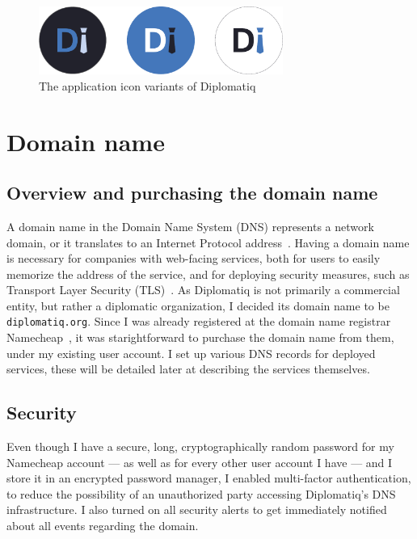 \begin{figure}[!htb]
    \centering
    \includegraphics[width=8cm]{figures/diplomatiq-app-icons.pdf}
    \caption{The application icon variants of Diplomatiq}
    \label{fig:diplomatiq-app-icons}
\end{figure}

\section{Domain name}

\subsection{Overview and purchasing the domain name}

A domain name in the Domain Name System (DNS) represents a network domain, or it translates to an Internet Protocol address~\cite{rfc1035}. Having a domain name is necessary for companies with web-facing services, both for users to easily memorize the address of the service, and for deploying security measures, such as Transport Layer Security (TLS)~\cite{rfc8446}. As Diplomatiq is not primarily a commercial entity, but rather a diplomatic organization, I decided its domain name to be \lstinline{diplomatiq.org}. Since I was already registered at the domain name registrar Namecheap~\cite{namecheap-website}, it was starightforward to purchase the domain name from them, under my existing user account. I set up various DNS records for deployed services, these will be detailed later at describing the services themselves.

\subsection{Security}

Even though I have a secure, long, cryptographically random password for my Namecheap account — as well as for every other user account I have — and I store it in an encrypted password manager, I enabled multi-factor authentication, to reduce the possibility of an unauthorized party accessing Diplomatiq's DNS infrastructure. I also turned on all security alerts to get immediately notified about all events regarding the domain.


